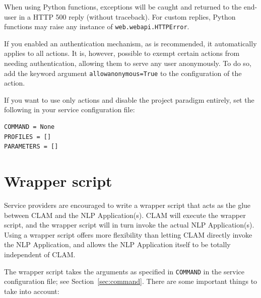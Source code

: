 \documentclass[a4paper,12pt,twoside,openright]{report}
\begin{document}
When using Python functions, exceptions will be caught and returned to the
end-user in a HTTP 500 reply (without traceback). For custom replies, Python
functions may raise any instance of \texttt{web.webapi.HTTPError}.

If you enabled an authentication mechanism, as is recommended, it automatically
applies to all actions. It is, however, possible to exempt certain actions from
needing authentication, allowing them to serve any user anonymously. To do so, add
the keyword argument \texttt{allowanonymous=True} to the configuration of the
action. 

If you want to use only actions and disable the project paradigm
entirely, set the following in your service configuration file:

{ \small
\begin{verbatim}
COMMAND = None
PROFILES = []
PARAMETERS = []
\end{verbatim}
}


\section{Wrapper script}

Service providers are encouraged to write a wrapper script that acts as the
glue between CLAM and the NLP Application(s). CLAM will execute the wrapper
script, and the wrapper script will in turn invoke the actual NLP
Application(s). Using a wrapper script offers more flexibility than letting
CLAM directly invoke the NLP Application, and allows the NLP Application itself
to be totally independent of CLAM. 

The wrapper script takes the arguments as specified in \texttt{COMMAND} in the
service configuration file; see Section~\ref{sec:command}. There are some
important things to take into account:
\end{document}
